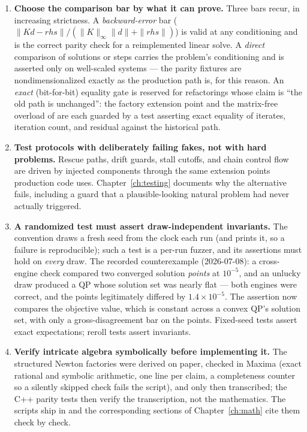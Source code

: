 \begin{enumerate}
\item \textbf{Choose the comparison bar by what it can prove.} Three bars
  recur, in increasing strictness. A \emph{backward-error} bar
  ($\|Kd - \mathit{rhs}\| / (\|K\|_\infty \|d\| + \|\mathit{rhs}\|)$)
  is valid at any conditioning and is the correct parity check for a
  reimplemented linear solve. A \emph{direct} comparison of solutions or
  steps carries the problem's conditioning and is asserted only on
  well-scaled systems --- the parity fixtures are nondimensionalized
  exactly as the production path is, for this reason. An \emph{exact}
  (bit-for-bit) equality gate is reserved for refactorings whose claim is
  ``the old path is unchanged'': the factory extension point and the
  matrix-free overload of  are each guarded by a test
  asserting exact equality of iterates, iteration count, and residual
  against the historical path.
\item \textbf{Test protocols with deliberately failing fakes, not with
  hard problems.} Rescue paths, drift guards, stall cutoffs, and chain
  control flow are driven by injected components through the same
  extension points production code uses. Chapter~\ref{ch:testing}
  documents why the alternative fails, including a guard that a
  plausible-looking natural problem had never actually triggered.
\item \textbf{A randomized test must assert draw-independent
  invariants.} The convention  draws a fresh seed from
  the clock each run (and prints it, so a failure is reproducible); such
  a test is a per-run fuzzer, and its assertions must hold on
  \emph{every} draw. The recorded counterexample (2026-07-08): a
  cross-engine check compared two converged solution \emph{points} at
  $10^{-5}$, and an unlucky draw produced a QP whose solution set was
  nearly flat --- both engines were correct, and the points legitimately
  differed by $1.4 \times 10^{-5}$. The assertion now compares the
  objective value, which is constant across a convex QP's solution set,
  with only a gross-disagreement bar on the points. Fixed-seed tests
  assert exact expectations; reroll tests assert invariants.
\item \textbf{Verify intricate algebra symbolically before implementing
  it.} The structured Newton factories were derived on paper, checked in
  Maxima \cite{maxima} (exact rational and symbolic arithmetic, one
   line per claim, a completeness counter so a silently
  skipped check fails the script), and only then transcribed; the C++
  parity tests then verify the transcription, not the mathematics. The
  scripts ship in  and the corresponding sections of
  Chapter~\ref{ch:math} cite them check by check.
\end{enumerate}

